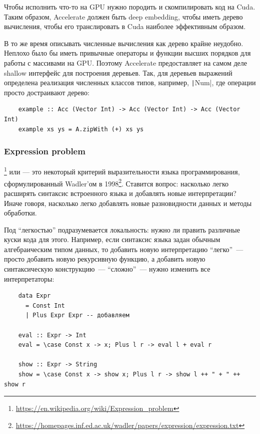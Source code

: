 Чтобы исполнить что-то на GPU нужно породить и скомпилировать код на Cuda.
Таким образом, Accelerate должен быть deep embedding, чтобы иметь дерево вычисления, чтобы его транслировать в Cuda наиболее эффективным образом.

В то же время описывать численные вычисления как дерево крайне неудобно.
Неплохо было бы иметь привычные операторы и функции высших порядков для работы с массивами на GPU\@.
Поэтому Accelerate предоставляет на самом деле shallow интерфейс для построения деревьев.
Так, для деревьев выражений определена реализация численных классов типов, например, \texttt|Num|, где операции просто достраивают дерево:
\begin{verbatim}
    example :: Acc (Vector Int) -> Acc (Vector Int) -> Acc (Vector Int)
    example xs ys = A.zipWith (+) xs ys
\end{verbatim}

\subsubsection{Expression problem} \label{subsec:expression-problem}

\footnote{\url{https://en.wikipedia.org/wiki/Expression_problem}} или  --- это некоторый критерий выразительности языка программирования, сформулированный Wadler'ом в 1998\footnote{\url{https://homepages.inf.ed.ac.uk/wadler/papers/expression/expression.txt}}.
Ставится вопрос: насколько легко расширять синтаксис встроенного языка и добавлять новые интерпретации?
Иначе говоря, насколько легко добавлять новые разновидности данных и методы обработки.

Под ``легкостью'' подразумевается локальность: нужно ли править различные куски кода для этого.
Например, если синтаксис языка задан обычным алгебраическим типом данных, то добавить новую интерпретацию ``легко''~--- просто добавить новую рекурсивную функцию, а добавить новую синтаксическую конструкцию~--- ``сложно''~--- нужно изменить все интерпретаторы:
\begin{verbatim}
    data Expr
      = Const Int
      | Plus Expr Expr -- добавляем

    eval :: Expr -> Int
    eval = \case Const x -> x; Plus l r -> eval l + eval r

    show :: Expr -> String
    show = \case Const x -> show x; Plus l r -> show l ++ " + " ++ show r
\end{verbatim}

